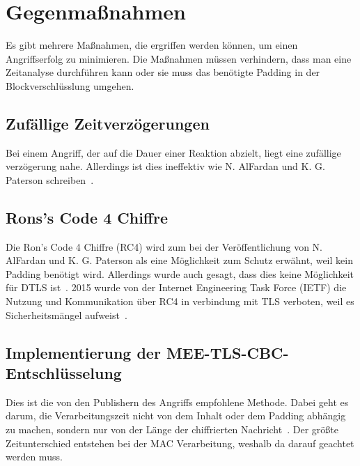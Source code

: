 \documentclass[a4paper,10pt]{scrartcl}
\begin{document}
    \section{Gegenmaßnahmen}\label{sec:gegenmanahmen}
    Es gibt mehrere Maßnahmen, die ergriffen werden können, um einen Angriffserfolg zu minimieren.
    Die Maßnahmen müssen verhindern, dass man eine Zeitanalyse durchführen kann oder sie muss das benötigte Padding in der Blockverschlüsslung umgehen.

    \subsection{Zufällige Zeitverzögerungen}\label{subsec:zufallige-zeitverzogerungen}
    Bei einem Angriff, der auf die Dauer einer Reaktion abzielt, liegt eine zufällige verzögerung nahe.
    Allerdings ist dies ineffektiv wie N. AlFardan und K. G. Paterson schreiben~\cite[S.13]{AlFardan2013}.

    \subsection{Rons's Code 4 Chiffre}\label{subsec:rons's-code-4-chiffre}
    Die Ron's Code 4 Chiffre (RC4) wird zum bei der Veröffentlichung von N. AlFardan und K. G. Paterson als eine Möglichkeit zum Schutz erwähnt, weil kein Padding benötigt wird.
    Allerdings wurde auch gesagt, dass dies keine Möglichkeit für DTLS ist~\cite[S.13]{AlFardan2013}.
    2015 wurde von der Internet Engineering Task Force (IETF)  die Nutzung und Kommunikation über RC4 in verbindung mit TLS verboten, weil es Sicherheitsmängel aufweist~\cite{IETF2015}.

    \subsection{Implementierung der MEE-TLS-CBC-Entschlüsselung}\label{subsec:implementierung-der-mee-tls-cbc-entschlusselung}
    Dies ist die von den Publishern des Angriffs empfohlene Methode.
    Dabei geht es darum, die Verarbeitungszeit nicht von dem Inhalt oder dem Padding abhängig zu machen, sondern nur von der Länge der chiffrierten Nachricht~\cite[S.13]{AlFardan2013}.
    Der größte Zeitunterschied entstehen bei der MAC Verarbeitung, weshalb da darauf geachtet werden muss.

    \newpage

    
\end{document}
